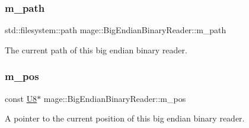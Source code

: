 \subsubsection{\texorpdfstring{m\+\_\+path}{m\_path}}
{\footnotesize\ttfamily std\+::filesystem\+::path mage\+::\+Big\+Endian\+Binary\+Reader\+::m\+\_\+path\hspace{0.3cm}{\ttfamily [private]}}

The current path of this big endian binary reader. \mbox{\label{classmage_1_1_big_endian_binary_reader_a7dbfc5ce1712e431f75d80a4f7a56e33}} 
\subsubsection{\texorpdfstring{m\+\_\+pos}{m\_pos}}
{\footnotesize\ttfamily const \mbox{\hyperlink{namespacemage_a30677c03d683c4c35630c25f6ff3fb7f}{U8}}$\ast$ mage\+::\+Big\+Endian\+Binary\+Reader\+::m\+\_\+pos\hspace{0.3cm}{\ttfamily [private]}}

A pointer to the current position of this big endian binary reader. 